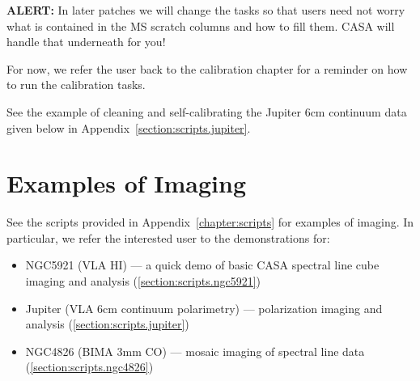 {\bf ALERT:} In later patches we
will change the tasks so that users need not worry what is contained in
the MS scratch columns and how to fill them.  CASA will handle that 
underneath for you!

For now, we refer the user back to the calibration chapter for
a reminder on how to run the calibration tasks. 

See the example of cleaning and self-calibrating the Jupiter 6cm continuum
data given below in Appendix~\ref{section:scripts.jupiter}.  

\section{Examples of Imaging}
\label{section:im.examples}

See the scripts provided in Appendix~\ref{chapter:scripts} for examples of
imaging.  In particular, we refer
the interested user to the demonstrations for:
\begin{itemize}
\item NGC5921 (VLA HI) --- a quick demo of basic CASA spectral line
      cube imaging and analysis
      (\ref{section:scripts.ngc5921})
\item Jupiter (VLA 6cm continuum polarimetry) --- polarization imaging
      and analysis
      (\ref{section:scripts.jupiter})
\item NGC4826 (BIMA 3mm CO) --- mosaic imaging of spectral line data
      (\ref{section:scripts.ngc4826})
\end{itemize}

